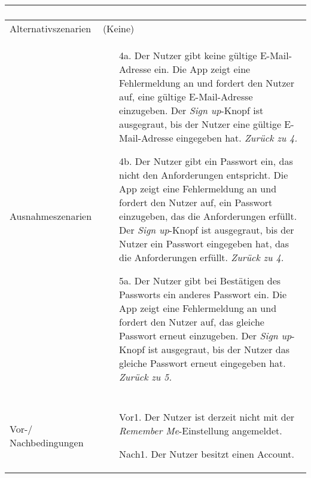 \begin{table}[H]
\begin{tabularx}{0.95\textwidth}{ |l|X| }
\begin{enumerate}[noitemsep]
		                                         \end{enumerate}                                                                        \\
		\hline
		Alternativszenarien                    & (Keine)                                                                                                                                               \\
		\hline
		Ausnahmeszenarien                      & \begin{enumerate}[noitemsep]
			                                         \item[4a.] Der Nutzer gibt keine gültige E-Mail-Adresse ein.
				                                         \subitem[4a1.] Die App zeigt eine Fehlermeldung an und fordert den Nutzer auf, eine gültige E-Mail-Adresse einzugeben.
				                                         \subitem[4a2.] Der \emph{Sign up}-Knopf ist ausgegraut, bis der Nutzer eine gültige E-Mail-Adresse eingegeben hat. \emph{Zurück zu 4.}
			                                         \item[4b.] Der Nutzer gibt ein Passwort ein, das nicht den Anforderungen entspricht.
				                                         \subitem[4b1.] Die App zeigt eine Fehlermeldung an und fordert den Nutzer auf, ein Passwort einzugeben, das die Anforderungen erfüllt.
				                                         \subitem[4b2.] Der \emph{Sign up}-Knopf ist ausgegraut, bis der Nutzer ein Passwort eingegeben hat, das die Anforderungen erfüllt. \emph{Zurück zu 4.}
			                                         \item[5a.] Der Nutzer gibt bei Bestätigen des Passworts ein anderes Passwort ein.
				                                         \subitem[5a1.] Die App zeigt eine Fehlermeldung an und fordert den Nutzer auf, das gleiche Passwort erneut einzugeben.
				                                         \subitem[5a2.] Der \emph{Sign up}-Knopf ist ausgegraut, bis der Nutzer das gleiche Passwort erneut eingegeben hat. \emph{Zurück zu 5.}
		                                         \end{enumerate} \\
		\hline
		\rowcolor{lightgray}                   &                                                                                                                                                       \\
		\hline
		Vor-/ Nachbedingungen                  & \begin{enumerate}[noitemsep]
			                                         \item[Vor1.] Der Nutzer ist derzeit nicht mit der \emph{Remember Me}-Einstellung angemeldet.
			                                         \item[Nach1.] Der Nutzer besitzt einen Account.
		                                         \end{enumerate}                                                           \\
		\hline
	\end{tabularx}
\end{table}


